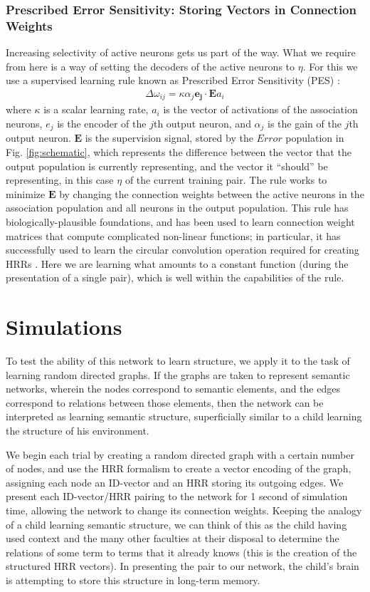 \documentclass[10pt,letterpaper]{article}
\begin{document}
\subsubsection{Prescribed Error Sensitivity: Storing Vectors in Connection Weights}
Increasing selectivity of active neurons gets us part of the way. What we require from here is a way of setting the decoders of the active neurons to $\eta$. For this we use a supervised learning rule known as Prescribed Error Sensitivity (PES) \citep{MacNeil2011a}:
\begin{align}
\Delta \omega_{ij} = \kappa \alpha_j \mathbf{e_j} \cdot \mathbf{E}a_i
\end{align}
where $\kappa$ is a scalar learning rate, $a_i$ is the vector of activations of the association neurons, $e_j$ is the encoder of the $j$th output neuron, and $\alpha_j$ is the gain of the $j$th output neuron. $\mathbf{E}$ is the supervision signal, stored by the $Error$ population in Fig. \ref{fig:schematic}, which represents the difference between the vector that the output population is currently representing, and the vector it ``should'' be representing, in this case $\eta$ of the current training pair. The rule works to minimize $\mathbf{E}$ by changing the connection weights between the active neurons in the association population and all neurons in the output population. This rule has biologically-plausible foundations, and has been used to learn connection weight matrices that compute complicated non-linear functions; in particular, it has successfully used to learn the circular convolution operation required for creating HRRs \citep{Stewart2011a}. Here we are learning what amounts to a constant function (during the presentation of a single pair), which is well within the capabilities of the rule.

\section{Simulations}
To test the ability of this network to learn structure, we apply it to the task of learning random directed graphs. If the graphs are taken to represent semantic networks, wherein the nodes correspond to semantic elements, and the edges correspond to relations between those elements, then the network can be interpreted as learning semantic structure, superficially similar to a child learning the structure of his environment.

We begin each trial by creating a random directed graph with a certain number of nodes, and use the HRR formalism to create a vector encoding of the graph, assigning each node an ID-vector and an HRR storing its outgoing edges. We present each ID-vector/HRR pairing to the network for 1 second of simulation time, allowing the network to change its connection weights. Keeping the analogy of a child learning semantic structure, we can think of this as the child having used context and the many other faculties at their disposal to determine the relations of some term to terms that it already knows (this is the creation of the structured HRR vectors). In presenting the pair to our network, the child's brain is attempting to store this structure in long-term memory.
\end{document}

